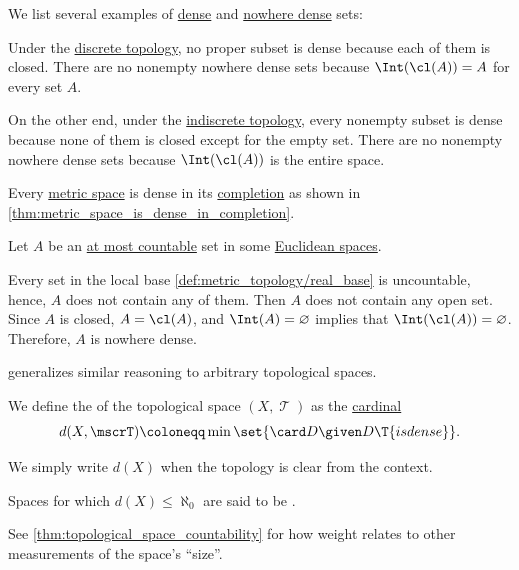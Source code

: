 \begin{example}\label{ex:def:topologically_dense_set}
  We list several examples of \hyperref[def:topologically_dense_set]{dense} and \hyperref[def:topologically_dense_set]{nowhere dense} sets:
  \begin{thmenum}
     Under the \hyperref[def:discrete_topology]{discrete topology}, no proper subset is dense because each of them is closed. There are no nonempty nowhere dense sets because \( \Int(\cl(A)) = A \) for every set \( A \).

     On the other end, under the \hyperref[def:indiscrete_topology]{indiscrete topology}, every nonempty subset is dense because none of them is closed except for the empty set. There are no nonempty nowhere dense sets because \( \Int(\cl(A)) \) is the entire space.

     Every \hyperref[def:metric_space]{metric space} is dense in its \hyperref[thm:metric_space_completion]{completion} as shown in \cref{thm:metric_space_is_dense_in_completion}.

     Let \( A \) be an \hyperref[def:aleph_zero_related_cardinalities]{at most countable} set in some \hyperref[def:euclidean_space]{Euclidean spaces}.

    Every set in the local base \eqref{def:metric_topology/real_base} is uncountable, hence, \( A \) does not contain any of them. Then \( A \) does not contain any open set. Since \( A \) is closed, \( A = \cl(A) \), and \( \Int(A) = \varnothing \) implies that \( \Int(\cl(A)) = \varnothing \). Therefore, \( A \) is nowhere dense.

     generalizes similar reasoning to arbitrary topological spaces.
  \end{thmenum}
\end{example}

\begin{definition}\label{def:topological_space_density}
  We define the  of the topological space \( (X, \mscrT) \) as the \hyperref[def:cardinal]{cardinal}
  \begin{equation*}
    d(X, \mscrT) \coloneqq \min \set{ \card D \given D \T{is dense} }.
  \end{equation*}

  We simply write \( d(X) \) when the topology is clear from the context.

  Spaces for which \( d(X) \leq \hyperref[def:aleph_hierarchy]{\aleph_0} \) are said to be .
\end{definition}
\begin{comments}
  \item See \cref{thm:topological_space_countability} for how weight relates to other measurements of the space's \enquote{size}.
\end{comments}

